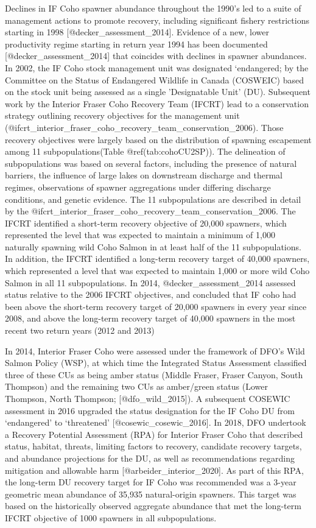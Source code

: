 \documentclass[
]{article}
\begin{document}
Declines in IF Coho spawner abundance throughout the 1990's led to a
suite of management actions to promote recovery, including significant
fishery restrictions starting in 1998 {[}@decker\_assessment\_2014{]}.
Evidence of a new, lower productivity regime starting in return year
1994 has been documented {[}@decker\_assessment\_2014{]} that coincides
with declines in spawner abundances. In 2002, the IF Coho stock
management unit was designated `endangered; by the Committee on the
Status of Endangered Wildlife in Canada (COSWEIC) based on the stock
unit being assessed as a single 'Designatable Unit' (DU). Subsequent
work by the Interior Fraser Coho Recovery Team (IFCRT) lead to a
conservation strategy outlining recovery objectives for the management
unit
(@ifcrt\_interior\_fraser\_coho\_recovery\_team\_conservation\_2006).
Those recovery objectives were largely based on the distribution of
spawning escapement among 11 subpopulations(Table @ref(tab:cohoCU2SP)).
The delineation of subpopulations was based on several factors,
including the presence of natural barriers, the influence of large lakes
on downstream discharge and thermal regimes, observations of spawner
aggregations under differing discharge conditions, and genetic evidence.
The 11 subpopulations are described in detail by the
@ifcrt\_interior\_fraser\_coho\_recovery\_team\_conservation\_2006. The
IFCRT identified a short-term recovery objective of 20,000 spawners,
which represented the level that was expected to maintain a minimum of
1,000 naturally spawning wild Coho Salmon in at least half of the 11
subpopulations. In addition, the IFCRT identified a long-term recovery
target of 40,000 spawners, which represented a level that was expected
to maintain 1,000 or more wild Coho Salmon in all 11 subpopulations. In
2014, @decker\_assessment\_2014 assessed status relative to the 2006
IFCRT objectives, and concluded that IF coho had been above the
short-term recovery target of 20,000 spawners in every year since 2008,
and above the long-term recovery target of 40,000 spawners in the most
recent two return years (2012 and 2013)

In 2014, Interior Fraser Coho were assessed under the framework of DFO's
Wild Salmon Policy (WSP), at which time the Integrated Status Assessment
classified three of these CUs as being amber status (Middle Fraser,
Fraser Canyon, South Thompson) and the remaining two CUs as amber/green
status (Lower Thompson, North Thompson; {[}@dfo\_wild\_2015{]}). A
subsequent COSEWIC assessment in 2016 upgraded the status designation
for the IF Coho DU from `endangered' to `threatened'
{[}@cosewic\_cosewic\_2016{]}. In 2018, DFO undertook a Recovery
Potential Assessment (RPA) for Interior Fraser Coho that described
status, habitat, threats, limiting factors to recovery, candidate
recovery targets, and abundance projections for the DU, as well as
recommendations regarding mitigation and allowable harm
{[}@arbeider\_interior\_2020{]}. As part of this RPA, the long-term DU
recovery target for IF Coho was recommended was a 3-year geometric mean
abundance of 35,935 natural-origin spawners. This target was based on
the historically observed aggregate abundance that met the long-term
IFCRT objective of 1000 spawners in all subpopulations.
\end{document}
